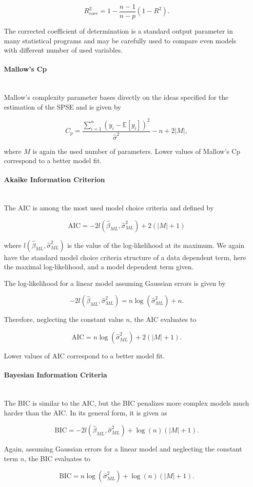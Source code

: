 \documentclass[10pt,a4paper]{article}
\newcommand{\subsubsubsection}[1]{\paragraph{#1}\mbox{}\\}
\begin{document}
$$R_{corr}^2 = 1 - \frac{n-1}{n-p}(1-R^2). $$

The corrected coefficient of determination is a standard output parameter in many statistical programs and may be carefully used to compare even models with different number of used variables. 

\subsubsubsection{Mallow's Cp}

Mallow's complexity parameter bases directly on the ideas specified for the estimation of the SPSE and is given by

$$C_p = \frac{\sum_{i=1}^n (y_i - \mathbb{E}[y_i])^2}{\hat \sigma^2} - n + 2 \vert M \vert,$$

where $M$ is again the used number of parameters. Lower values of Mallow's Cp correspond to a better model fit.

\subsubsubsection{Akaike Information Criterion}

The AIC is among the most used model choice criteria and defined by

$$\text{AIC} = -2 l(\hat \beta_{ML}, \hat \sigma^2_{ML}) + 2(\vert M \vert +1)$$

where $l(\hat \beta_{ML}, \hat \sigma^2_{ML})$ is the value of the log-likelihood at its maximum. We again have the standard model choice criteria structure of a data dependent term, here the maximal log-likelihood, and a model dependent term given. 

The log-likelihood for a linear model assuming Gaussian errors is given by

$$-2l(\hat\beta_{ML}, \hat \sigma_{ML}^2) = n \log(\hat \sigma_{ML}^2) + n.$$

Therefore, neglecting the constant value $n$, the AIC evaluates to

$$\text{AIC} = n \log(\hat \sigma^2_{ML}) + 2(\vert M \vert + 1).$$

Lower values of AIC correspond to a better model fit. 

\subsubsubsection{Bayesian Information Criteria}

The BIC is similar to the AIC, but the BIC penalizes more complex models much harder than the AIC. In its general form, it is given as 

$$\text{BIC} = -2l(\hat\beta_{ML}, \hat \sigma^2_{ML}) + \log(n) (\vert M \vert + 1).$$

Again, assuming Gaussian errors for a linear model and neglecting the constant term $n$, the BIC evaluates to

$$\text{BIC} = n\log(\hat \sigma_{ML}^2) + \log(n)(\vert M\vert + 1).$$
\end{document}
